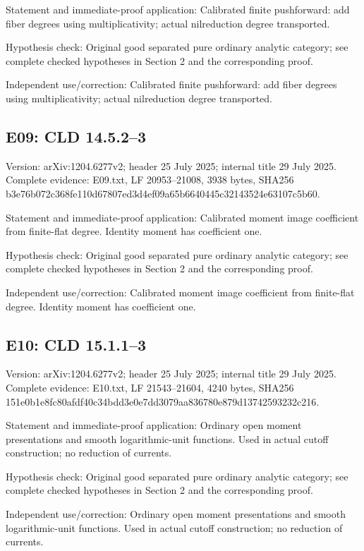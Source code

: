 \documentclass[11pt]{article}
\begin{document}
Statement and immediate-proof application: Calibrated finite pushforward: add fiber degrees using multiplicativity; actual nilreduction degree transported.

Hypothesis check: Original good separated pure ordinary analytic category; see complete checked hypotheses in Section 2 and the corresponding proof.

Independent use/correction: Calibrated finite pushforward: add fiber degrees using multiplicativity; actual nilreduction degree transported.

\subsection{E09: CLD 14.5.2--3}

Version: arXiv:1204.6277v2; header 25 July 2025; internal title 29 July 2025. Complete evidence: E09.txt, LF 20953--21008, 3938 bytes, SHA256 b3e76b072c368fe110d67807ed3d4ef09a65b6640445c32143524e63107c5b60.

Statement and immediate-proof application: Calibrated moment image coefficient from finite-flat degree. Identity moment has coefficient one.

Hypothesis check: Original good separated pure ordinary analytic category; see complete checked hypotheses in Section 2 and the corresponding proof.

Independent use/correction: Calibrated moment image coefficient from finite-flat degree. Identity moment has coefficient one.

\subsection{E10: CLD 15.1.1--3}

Version: arXiv:1204.6277v2; header 25 July 2025; internal title 29 July 2025. Complete evidence: E10.txt, LF 21543--21604, 4240 bytes, SHA256 151e0b1e8fc80afdf40c34bdd3e0e7dd3079aa836780e879d13742593232c216.

Statement and immediate-proof application: Ordinary open moment presentations and smooth logarithmic-unit functions. Used in actual cutoff construction; no reduction of currents.

Hypothesis check: Original good separated pure ordinary analytic category; see complete checked hypotheses in Section 2 and the corresponding proof.

Independent use/correction: Ordinary open moment presentations and smooth logarithmic-unit functions. Used in actual cutoff construction; no reduction of currents.
\end{document}
